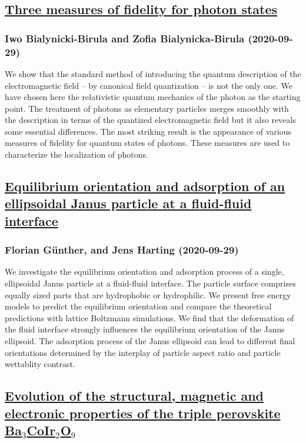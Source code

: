 \subsection*{\href{http://arxiv.org/abs/2009.13842v1}{Three measures of fidelity for photon states}}
\subsubsection*{Iwo Bialynicki-Birula and Zofia Bialynicka-Birula (2020-09-29)}
We show that the standard method of introducing the quantum description of
the electromagnetic field -- by canonical field quantization -- is not the only
one. We have chosen here the relativistic quantum mechanics of the photon as
the starting point. The treatment of photons as elementary particles merges
smoothly with the description in terms of the quantized electromagnetic field
but it also reveals some essential differences. The most striking result is the
appearance of various measures of fidelity for quantum states of photons. These
measures are used to characterize the localization of photons.

\subsection*{\href{http://arxiv.org/abs/2009.13834v1}{Equilibrium orientation and adsorption of an ellipsoidal Janus particle  at a fluid-fluid interface}}
\subsubsection*{Florian Günther, and Jens Harting (2020-09-29)}
We investigate the equilibrium orientation and adsorption process of a
single, ellipsoidal Janus particle at a fluid-fluid interface. The particle
surface comprises equally sized parts that are hydrophobic or hydrophilic. We
present free energy models to predict the equilibrium orientation and compare
the theoretical predictions with lattice Boltzmann simulations. We find that
the deformation of the fluid interface strongly influences the equilibrium
orientation of the Janus ellipsoid. The adsorption process of the Janus
ellipsoid can lead to different final orientations determined by the interplay
of particle aspect ratio and particle wettablity contrast.

\subsection*{\href{http://arxiv.org/abs/2009.13822v1}{Evolution of the structural, magnetic and electronic properties of the  triple perovskite Ba$_{3}$CoIr$_{2}$O$_{9}$}}
